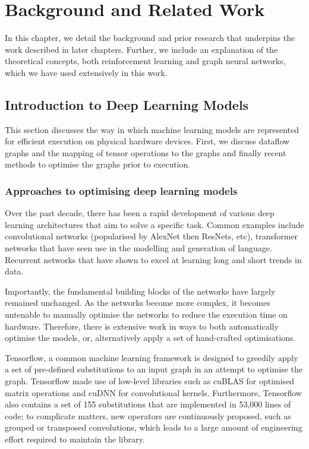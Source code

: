 \chapter{Background and Related Work}
In this chapter, we detail the background and prior research that underpins the work described in later chapters. Further, we include an explanation of the theoretical concepts, both reinforcement learning and graph neural networks, which we have used extensively in this work.

\section{Introduction to Deep Learning Models}
This section discusses the way in which machine learning models are represented for efficient execution on physical hardware devices. First, we discuss dataflow graphs and the mapping of tensor operations to the graphs and finally recent methods to optimise the graphs prior to execution.

\subsection{Approaches to optimising deep learning models}
Over the past decade, there has been a rapid development of various deep learning architectures that aim to solve a specific task. Common examples include convolutional networks (popularised by AlexNet then ResNets, etc), transformer networks that have seen use in the modelling and generation of language. Recurrent networks that have shown to excel at learning long and short trends in data.

Importantly, the fundamental building blocks of the networks have largely remained unchanged.  As the networks become more complex, it becomes untenable to manually optimise the networks to reduce the execution time on hardware. Therefore, there is extensive work in ways to both automatically optimise the models, or, alternatively apply a set of hand-crafted optimisations.

Tensorflow, a common machine learning framework is designed to greedily apply a set of pre-defined substitutions to an input graph in an attempt to optimise the graph. Tensorflow made use of low-level libraries such as cuBLAS for optimised matrix operations and cuDNN for convolutional kernels. Furthermore, Tensorflow also contains a set of 155 substitutions that are implemented in 53,000 lines of code; to complicate matters, new operators are continuously proposed, such as grouped or transposed convolutions, which leads to a large amount of engineering effort required to maintain the library.





